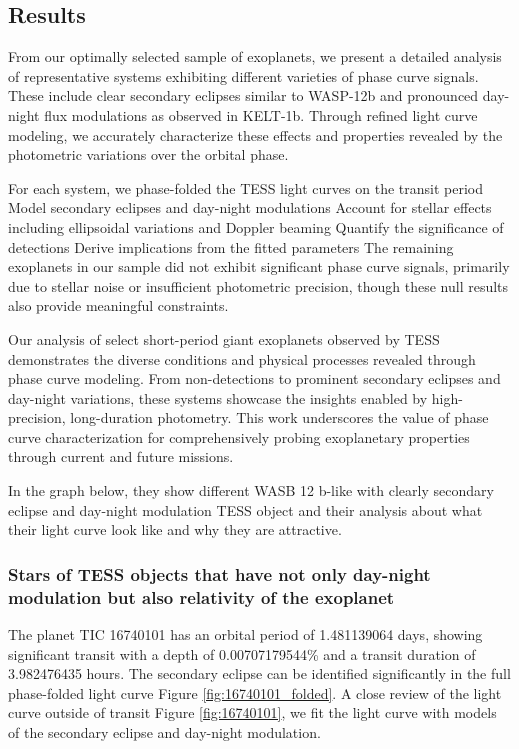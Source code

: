 \documentclass{article}
\begin{document}
\subsection{Results}

From our optimally selected sample of exoplanets, we present a detailed analysis of representative systems exhibiting different varieties of phase curve signals. These include clear secondary eclipses similar to WASP-12b and pronounced day-night flux modulations as observed in KELT-1b. Through refined light curve modeling, we accurately characterize these effects and properties revealed by the photometric variations over the orbital phase.

For each system, we phase-folded the TESS light curves on the transit period
Model secondary eclipses and day-night modulations
Account for stellar effects including ellipsoidal variations and Doppler beaming
Quantify the significance of detections
Derive implications from the fitted parameters
The remaining exoplanets in our sample did not exhibit significant phase curve signals, primarily due to stellar noise or insufficient photometric precision, though these null results also provide meaningful constraints.

Our analysis of select short-period giant exoplanets observed by TESS demonstrates the diverse conditions and physical processes revealed through phase curve modeling. From non-detections to prominent secondary eclipses and day-night variations, these systems showcase the insights enabled by high-precision, long-duration photometry. This work underscores the value of phase curve characterization for comprehensively probing exoplanetary properties through current and future missions.

In the graph below, they show different WASB 12 b-like with clearly secondary eclipse and day-night modulation TESS object and their analysis about what their light curve look like and why they are attractive.
\newpage

\subsubsection{Stars of TESS objects that have not only day-night modulation but also relativity of the exoplanet}

The planet TIC 16740101 has an orbital period of 1.481139064 days, showing significant transit with a depth of 0.00707179544\% and a transit duration of 3.982476435 hours. The secondary eclipse can be identified significantly in the full phase-folded light curve Figure \ref{fig:16740101_folded}. A close review of the light curve outside of transit Figure \ref{fig:16740101}, we fit the light curve with models of the secondary eclipse and day-night modulation.
\end{document}
